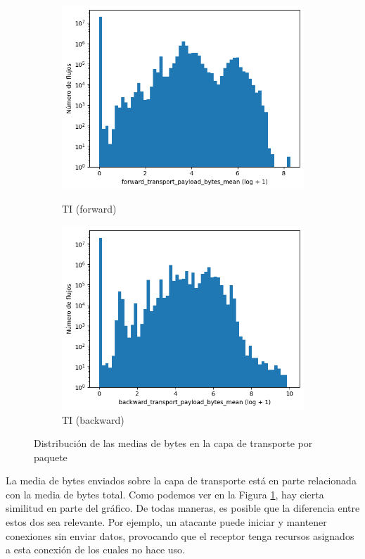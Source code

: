 \begin{figure}[H]
\begin{subfigure}[b]{0.26\textwidth}
        \includegraphics[width=\linewidth]{media/packet_pincer_toniot/forward_transport_payload_bytes_mean_log_x_log_y.png}
        \caption{TI (forward)}
        \includegraphics[width=\linewidth]{media/packet_pincer_toniot/backward_transport_payload_bytes_mean_log_x_log_y.png}
        \caption{TI (backward)}
    \end{subfigure}
       \caption{Distribución de las medias de bytes en la capa de transporte por paquete}
       \label{fig:packet_pincer_bidirectional_transport_payload_bytes_mean}
\end{figure}

La media de bytes enviados sobre la capa de transporte está en parte relacionada con la media de bytes total. Como podemos ver en la Figura \ref{fig:packet_pincer_bidirectional_transport_payload_bytes_mean}, hay cierta similitud en parte del gráfico. De todas maneras, es posible que la diferencia entre estos dos sea relevante. Por ejemplo, un atacante puede iniciar y mantener conexiones sin enviar datos, provocando que el receptor tenga recursos asignados a esta conexión de los cuales no hace uso.

